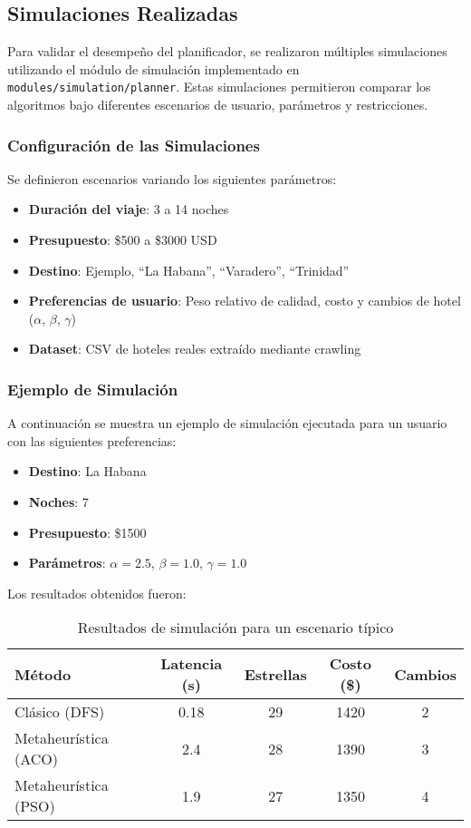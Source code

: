 \documentclass[runningheads]{llncs}
\begin{document}
\subsection{Simulaciones Realizadas}

Para validar el desempeño del planificador, se realizaron múltiples simulaciones utilizando el módulo de simulación implementado en \texttt{modules/simulation/planner}. Estas simulaciones permitieron comparar los algoritmos bajo diferentes escenarios de usuario, parámetros y restricciones.

\subsubsection{Configuración de las Simulaciones}

Se definieron escenarios variando los siguientes parámetros:
\begin{itemize}
    \item \textbf{Duración del viaje}: 3 a 14 noches
    \item \textbf{Presupuesto}: \$500 a \$3000 USD
    \item \textbf{Destino}: Ejemplo, ``La Habana'', ``Varadero'', ``Trinidad''
    \item \textbf{Preferencias de usuario}: Peso relativo de calidad, costo y cambios de hotel ($\alpha$, $\beta$, $\gamma$)
    \item \textbf{Dataset}: CSV de hoteles reales extraído mediante crawling
\end{itemize}

\subsubsection{Ejemplo de Simulación}

A continuación se muestra un ejemplo de simulación ejecutada para un usuario con las siguientes preferencias:
\begin{itemize}
    \item \textbf{Destino}: La Habana
    \item \textbf{Noches}: 7
    \item \textbf{Presupuesto}: \$1500
    \item \textbf{Parámetros}: $\alpha=2.5$, $\beta=1.0$, $\gamma=1.0$
\end{itemize}

Los resultados obtenidos fueron:

\begin{table}[H]
\centering
\begin{tabular}{lcccc}
\toprule
\textbf{Método} & \textbf{Latencia (s)} & \textbf{Estrellas} & \textbf{Costo (\$)} & \textbf{Cambios} \\
\midrule
Clásico (DFS) & 0.18 & 29 & 1420 & 2 \\
Metaheurística (ACO) & 2.4 & 28 & 1390 & 3 \\
Metaheurística (PSO) & 1.9 & 27 & 1350 & 4 \\
\bottomrule
\end{tabular}
\caption{Resultados de simulación para un escenario típico}
\end{table}
\end{document}
